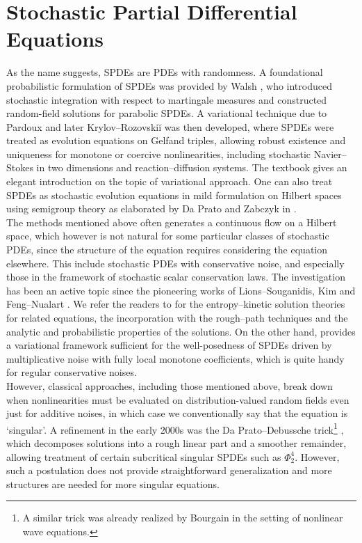 \section{Stochastic Partial Differential Equations}\label{sec:SPDE}

As the name suggests, SPDEs are PDEs with randomness. A foundational probabilistic formulation of SPDEs was provided by Walsh \cite{walsh1986spde}, who introduced stochastic integration with respect to martingale measures and constructed random-field solutions for parabolic SPDEs.  A variational technique due to Pardoux and later Krylov–Rozovskiĭ \cite{krylovrozovskii1981} was then developed, where SPDEs were treated as evolution equations on Gelfand triples, allowing robust existence and uniqueness for monotone or coercive nonlinearities, including stochastic Navier–Stokes in two dimensions and reaction–diffusion systems. The textbook \cite{LR15} gives an elegant introduction on the topic of variational approach. One can also treat SPDEs as stochastic evolution equations in mild formulation on Hilbert spaces using semigroup theory as elaborated by Da Prato and Zabczyk in \cite{dapratozabczyk1992}. \\

The methods mentioned above often generates a continuous flow on a Hilbert space, which however is not natural for some particular classes of stochastic PDEs, since the structure of the equation requires considering the equation elsewhere.  
This include stochastic PDEs with conservative noise, and especially those in the framework of stochastic scalar conservation laws. The investigation has been an active topic since the pioneering works of Lions--Souganidis, Kim and Feng--Nualart \cite{LS98-1,Kim2003, FengNualart2008}. We refer the readers to \cite{LPS13,LPS14, FG16, GS15,GS17,DG20,KKRS18,KKRS20} for the entropy--kinetic solution theories for related equations, the incorporation with the rough--path techniques and the analytic and probabilistic properties of the solutions. On the other hand, \cite{RSZ22} provides a variational framework sufficient for the well-posedness of SPDEs driven by multiplicative noise with fully local monotone coefficients, which is quite handy for regular conservative noises. \\

However, classical approaches, including those mentioned above, break down when nonlinearities must be evaluated on distribution-valued random fields even just for additive noises, in which case we conventionally say that the equation is `singular'. A refinement in the early 2000s was the Da Prato–Debussche trick\footnote{A similar trick was already realized by Bourgain \cite{Bourgain1996} in the setting of nonlinear wave equations. } \cite{dapratodebussche2003}, which decomposes solutions into a rough linear part and a smoother remainder, allowing treatment of certain subcritical singular SPDEs such as $\Phi^4_2$. However, such a postulation does not provide straightforward generalization and more structures are needed for more singular equations.

